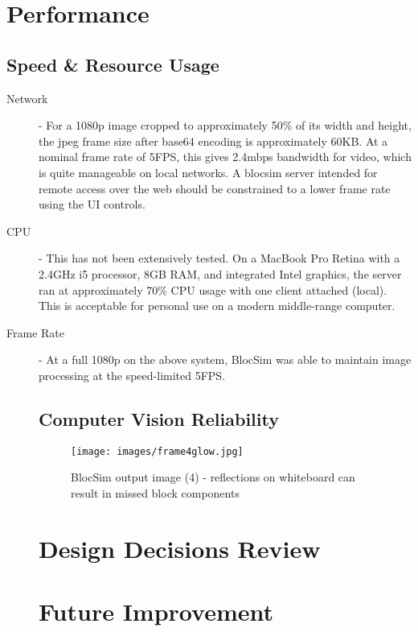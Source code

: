 \clearpage

\section{Performance}



\subsection{Speed \& Resource Usage}

\begin{description}
	\item[Network] - For a 1080p image cropped to approximately 50\% of its width and height, the jpeg frame size after base64 encoding is approximately 60KB. At a nominal frame rate of 5FPS, this gives 2.4mbps bandwidth for video, which is quite manageable on local networks. A blocsim server intended for remote access over the web should be constrained to a lower frame rate using the UI controls.
	\item[CPU] - This has not been extensively tested. On a MacBook Pro Retina with a 2.4GHz i5 processor, 8GB RAM, and integrated Intel graphics, the server ran at approximately 70\% CPU usage with one client attached (local). This is acceptable for personal use on a modern middle-range computer. 
	\item[Frame Rate] - At a full 1080p on the above system, BlocSim was able to maintain image processing at the speed-limited 5FPS.
\begin{description}


\subsection{Computer Vision Reliability}

\begin{figure}[ht!]
\centering
\texttt{[image: images/frame4glow.jpg]}
\caption{BlocSim output image (4) - reflections on whiteboard can result in missed block components}
\label{im:frame4glow}
\end{figure}


\section{Design Decisions Review}


\section{Future Improvement}


\end{description}
\end{description}

